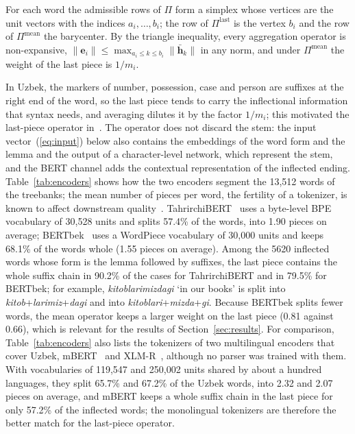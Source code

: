 \documentclass[mathematics,article,submit,pdftex,oneauthor]{Definitions/mdpi}
\begin{document}
\begin{Remark}\label{rem:pooling}
For each word the admissible rows of $\Pi$ form a simplex whose vertices are the unit vectors with the indices $a_i,\dots,b_i$; the row of $\Pi^{\mathrm{last}}$ is the vertex $b_i$ and the row of $\Pi^{\mathrm{mean}}$ the barycenter.
By the triangle inequality, every aggregation operator is non-expansive, $\|\mathbf e_i\|\leqslant\max_{a_i\leqslant k\leqslant b_i}\|\bar{\mathbf h}_k\|$ in any norm, and under $\Pi^{\mathrm{mean}}$ the weight of the last piece is $1/m_i$.
\end{Remark}

In Uzbek, the markers of number, possession, case and person are suffixes at the right end of the word, so the last piece tends to carry the inflectional information that syntax needs, and averaging dilutes it by the factor $1/m_i$; this motivated the last-piece operator in~\cite{MatlatipovNLDB2027}.
The operator does not discard the stem: the input vector~(\ref{eq:input}) below also contains the embeddings of the word form and the lemma and the output of a character-level network, which represent the stem, and the BERT channel adds the contextual representation of the inflected ending.
Table~\ref{tab:encoders} shows how the two encoders segment the 13,512 words of the treebanks; the mean number of pieces per word, the fertility of a tokenizer, is known to affect downstream quality~\cite{Rust2021}.
TahrirchiBERT~\cite{Mamasaidov2023} uses a byte-level BPE vocabulary of 30,528 units and splits 57.4\% of the words, into 1.90 pieces on average; BERTbek~\cite{Kuriyozov2024} uses a WordPiece vocabulary of 30,000 units and keeps 68.1\% of the words whole (1.55 pieces on average).
Among the 5620 inflected words whose form is the lemma followed by suffixes, the last piece contains the whole suffix chain in 90.2\% of the cases for TahrirchiBERT and in 79.5\% for BERTbek; for example, \textit{kitoblarimizdagi} `in our books' is split into \textit{kitob}+\textit{larimiz}+\textit{dagi} and into \textit{kitoblari}+\textit{mizda}+\textit{gi}.
Because BERTbek splits fewer words, the mean operator keeps a larger weight on the last piece (0.81 against 0.66), which is relevant for the results of Section~\ref{sec:results}.
For comparison, Table~\ref{tab:encoders} also lists the tokenizers of two multilingual encoders that cover Uzbek, mBERT~\cite{Devlin2019} and XLM-R~\cite{Conneau2020}, although no parser was trained with them.
With vocabularies of 119,547 and 250,002 units shared by about a hundred languages, they split 65.7\% and 67.2\% of the Uzbek words, into 2.32 and 2.07 pieces on average, and mBERT keeps a whole suffix chain in the last piece for only 57.2\% of the inflected words; the monolingual tokenizers are therefore the better match for the last-piece operator.
\end{document}
